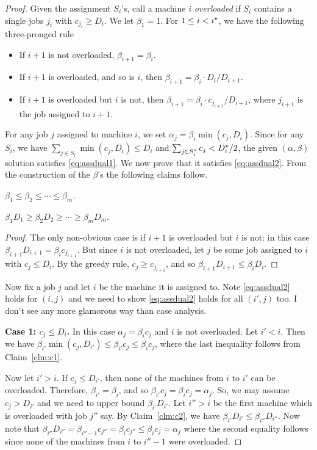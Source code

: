 \begin{proof}
Given the assignment $S_i$'s, call a machine $i$ {\em overloaded} if $S_i$ contains a single jobs $j_i$ with $c_{j_i} \geq D_i$. 
We let $\beta_1 = 1$. For $1\leq i <i^\star$, we have the following three-pronged rule
\begin{itemize}[noitemsep]
	\item If $i+1$ is not overloaded, $\beta_{i+1} = \beta_i$.
	\item If $i+1$ is overloaded, and so is $i$, then $\beta_{i+1} = \beta_i \cdot D_i/D_{i+1}$.
	\item If $i+1$ is overloaded but $i$ is not, then $\beta_{i+1} = \beta_i \cdot c_{j_{i+1}}/D_{i+1}$, where $j_{i+1}$ is the job assigned to $i+1$.
\end{itemize}
For any job $j$ assigned to machine $i$, we set $\alpha_j = \beta_i \min(c_j,D_i)$. Since for any $S_i$, we have $\sum_{j\in S_i} \min(c_j,D_i) \leq D_i$ and $\sum_{j\in S_i^\star} c_j < D_i^\star/2$,  the given $(\alpha,\beta)$ solution satisfies \eqref{eq:assdual1}. We now prove that it satisfies \eqref{eq:assdual2}.
From the construction of the $\beta$'s the following claims follow.
\begin{claim}\label{clm:c1}
$\beta_1\leq \beta_2 \leq \cdots \leq \beta_m$.
\end{claim}
\begin{claim}\label{clm:c2}
$\beta_1D_1 \geq \beta_2D_2 \geq \cdots \geq \beta_mD_m$.
\end{claim}
\begin{proof}
	The only non-obvious case is if $i+1$ is overloaded but $i$ is not: in this case $\beta_{i+1}D_{i+1} = \beta_ic_{j_{i+1}}$. But since $i$ is not overloaded, let $j$ be some job assigned to $i$ with $c_j \leq D_i$.
	By the greedy rule, $c_j \geq c_{j_{i+1}}$, and so $\beta_{i+1}D_{i+1} \leq \beta_iD_i$.
\end{proof}
\noindent
Now fix a job $j$ and let $i$ be the machine it is assigned to. Note \eqref{eq:assdual2} holds for $(i,j)$ and we need to show \eqref{eq:assdual2} holds for all $(i',j)$ too.
I don't see any more glamorous way than case analysis. \smallskip

\noindent
{\bf Case 1: $c_j \leq D_i$.} In this case $\alpha_j = \beta_ic_j$ and $i$ is not overloaded. 
Let $i' < i$.  Then we have $\beta_{i'}\min(c_j,D_{i'}) \le \beta_{i'}c_j \leq \beta_ic_j$, where the last inequality follows from Claim~\ref{clm:c1}.

Now let $i' > i$. If $c_j \leq D_{i'}$, then none of the machines from $i$ to $i'$ can be overloaded. Therefore, $\beta_{i'} = \beta_i$, and so $\beta_{i'}c_j = \beta_ic_j = \alpha_j$.
So, we may assume $c_j > D_{i'}$ and we need to upper bound $\beta_{i'}D_{i'}$. Let $i'' > i$ be the first machine which is overloaded with job $j''$ say.
By Claim~\ref{clm:c2}, we have $\beta_{i'}D_{i'} \leq \beta_{i''}D_{i''}$. Now note that
$\beta_{i''}D_{i''}  = \beta_{i''-1}c_{j''} = \beta_ic_{j''} \leq \beta_ic_j = \alpha_j$ where the second equality follows since none of the machines from $i$ to $i''-1$ were overloaded. \smallskip


\end{proof}

